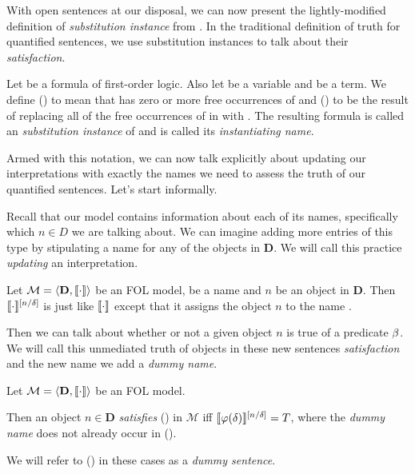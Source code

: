 With open sentences at our disposal, we can now present the lightly-modified
definition of \emph{substitution instance} from \cite{Mag25}. In the traditional
definition of truth for quantified sentences, we use substitution instances to
talk about their \emph{satisfaction}.

\begin{definition}
  \label{def:fol-substitution-instance}
  Let \ephi be a formula of first-order logic. Also let \exi be a variable
  and \etau be a term. We define \ephi(\exi) to mean that \ephi has zero or
  more free occurrences of \exi and \ephi(\etau) to be the result of
  replacing all of the free occurrences of \exi in \ephi with \etau. The
  resulting formula is called an \emph{substitution instance} of \ephi and
  \etau is called its \emph{instantiating name}.
\end{definition}

Armed with this notation, we can now talk explicitly about updating our
interpretations with exactly the names we need to assess the truth of our
quantified sentences. Let's start informally.

Recall that our model contains information about each of its names, specifically
which $n\in D$ we are talking about. We can imagine adding more entries of this
type by stipulating a name for any of the objects in \textbf{D}. We will call
this practice \emph{updating} an interpretation.

\begin{definition}
  \label{def:fol-update}
  Let $\mathcal{M}=\langle\mathbf{D},\llbracket\cdot\rrbracket\rangle$ be an FOL model,
  \edelta be a name and $n$ be an object in \textbf{D}. Then
  $\llbracket\cdot\rrbracket^{[n/\delta]}$ is just like $\llbracket\cdot\rrbracket$ except 
  that it assigns the object $n$ to the name \edelta.
\end{definition}

Then we can talk about whether or not a given object $n$ is true of a predicate
$\beta$. We will call this unmediated truth of objects in these new sentences
\emph{satisfaction} and the new name we add a \emph{dummy name}.

\begin{definition}[Satisfaction]
  \label{def:fol-satisfaction}
  Let $\mathcal{M}=\langle\mathbf{D},\llbracket\cdot\rrbracket\rangle$ be an FOL model.
  
  Then an object $n\in\mathbf{D}$ \emph{satisfies} \ephi(\exi) in $\mathcal{M}$
  iff $\llbracket\varphi(\delta)\rrbracket^{[n/\delta]}=T$, where the \emph{dummy name}
  \edelta does not already occur in \ephi(\exi).

  We will refer to \ephi(\etau) in these cases as a \emph{dummy sentence}.
\end{definition}


